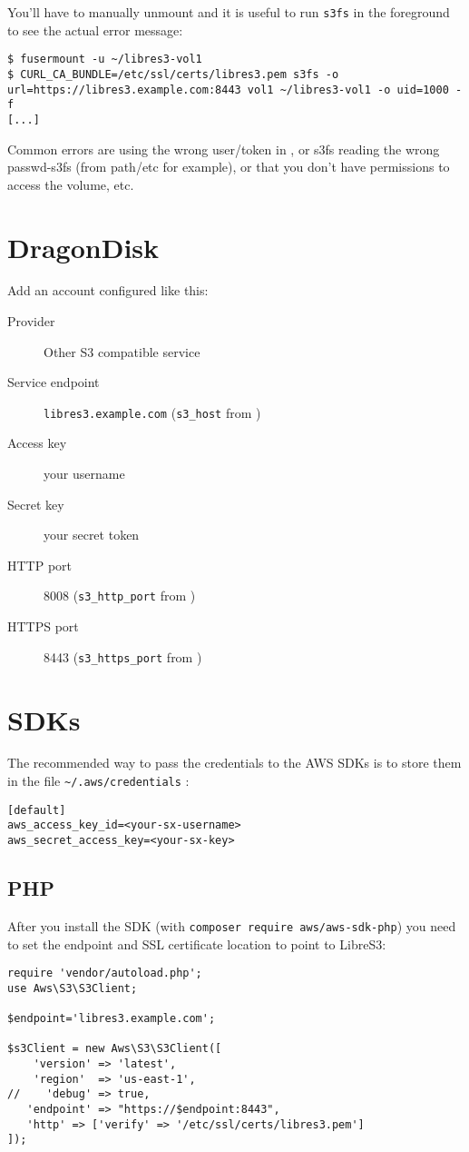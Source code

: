 You'll have to manually unmount and it is useful to run \verb|s3fs| in the
foreground to see the actual error message:
\begin{lstlisting}
$ fusermount -u ~/libres3-vol1
$ CURL_CA_BUNDLE=/etc/ssl/certs/libres3.pem s3fs -o url=https://libres3.example.com:8443 vol1 ~/libres3-vol1 -o uid=1000 -f
[...]
\end{lstlisting}

Common errors are using the wrong user/token in , or
s3fs reading the wrong passwd-s3fs (from path{/etc} for example), or that you don't have permissions to access the volume, etc.

\section{DragonDisk}
\label{sec:dragondisk}

Add an account configured like this:
\begin{description}
\item [Provider] Other S3 compatible service
\item [Service endpoint] \verb|libres3.example.com| (\verb|s3_host| from )
\item [Access key] your \SX username
\item [Secret key] your \SX secret token
\item [HTTP port] 8008 (\verb|s3_http_port| from )
\item [HTTPS port] 8443 (\verb|s3_https_port| from )
\end{description}

\section{SDKs}

The recommended way to pass the credentials to the AWS SDKs is to
store them in the file \verb|~/.aws/credentials| :
\begin{lstlisting}
[default]
aws_access_key_id=<your-sx-username>
aws_secret_access_key=<your-sx-key>
\end{lstlisting}

\subsection{PHP}

After you install the SDK (with \verb|composer require aws/aws-sdk-php|) you
need to set the endpoint and SSL certificate location to point to LibreS3:
\begin{lstlisting}
require 'vendor/autoload.php';
use Aws\S3\S3Client;

$endpoint='libres3.example.com';

$s3Client = new Aws\S3\S3Client([
    'version' => 'latest',
    'region'  => 'us-east-1',
//    'debug' => true,
   'endpoint' => "https://$endpoint:8443",
   'http' => ['verify' => '/etc/ssl/certs/libres3.pem']
]);
\end{lstlisting}


